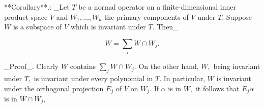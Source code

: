 

**Corollary**.: _Let \(T\) be a normal operator on a finite-dimensional inner product space \(V\) and \(W_{1},\ldots,\)\(W_{k}\) the primary components of \(V\) under \(T.\) Suppose \(W\) is a subspace of \(V\) which is invariant under \(T.\) Then_

\[W=\sum_{i}W\cap W_{j}.\]

_Proof_. Clearly \(W\) contains \(\sum\limits_{j}W\cap W_{j}.\) On the other hand, \(W,\) being invariant under \(T,\) is invariant under every polynomial in \(T.\) In particular, \(W\) is invariant under the orthogonal projection \(E_{j}\) of \(V\) on \(W_{j}.\) If \(\alpha\) is in \(W,\) it follows that \(E_{j}\alpha\) is in \(W\cap W_{j},\)